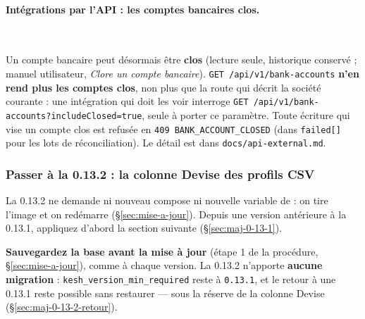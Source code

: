 \documentclass[a4paper,11pt,oneside]{article}
\begin{document}
\paragraph{Intégrations par l'API : les comptes bancaires clos.}\mbox{}\\
\begin{sloppypar}
Un compte bancaire peut désormais être \textbf{clos} (lecture seule, historique conservé ; manuel utilisateur, \emph{Clore un compte bancaire}). \texttt{GET /api/v1/bank-accounts} \textbf{n'en rend plus les comptes clos}, non plus que la route qui décrit la société courante : une intégration qui doit les voir interroge \texttt{GET /api/v1/bank-accounts?includeClosed=true}, seule à porter ce paramètre. Toute écriture qui vise un compte clos est refusée en \texttt{409 BANK\_ACCOUNT\_CLOSED} (dans \texttt{failed[]} pour les lots de réconciliation). Le détail est dans \texttt{docs/api-external.md}.
\end{sloppypar}

\subsubsection{Passer à la 0.13.2 : la colonne Devise des profils CSV}\label{sec:maj-0-13-2}

La 0.13.2 ne demande ni nouveau compose ni nouvelle variable de  : on tire l'image et on redémarre (\S\ref{sec:mise-a-jour}). Depuis une version antérieure à la 0.13.1, appliquez d'abord la section suivante (\S\ref{sec:maj-0-13-1}).

\begin{sloppypar}
\textbf{Sauvegardez la base avant la mise à jour} (étape 1 de la procédure, \S\ref{sec:mise-a-jour}), comme à chaque version. La 0.13.2 n'apporte \textbf{aucune migration} : \texttt{kesh\_version\_min\_required} reste à \texttt{0.13.1}, et le retour à une 0.13.1 reste possible sans restaurer --- sous la réserve de la colonne Devise (\S\ref{sec:maj-0-13-2-retour}).
\end{sloppypar}
\end{document}
